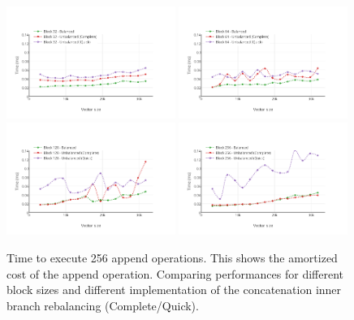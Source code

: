 \begin{figure}[h!]
  \centering
  \includegraphics[width=0.49\textwidth]{Benchmarks/Append_blocks_32.pdf}
  \includegraphics[width=0.49\textwidth]{Benchmarks/Append_blocks_64.pdf}
  \includegraphics[width=0.49\textwidth]{Benchmarks/Append_blocks_128.pdf}
  \includegraphics[width=0.49\textwidth]{Benchmarks/Append_blocks_256.pdf}
  \label{IterationBlocksBenchmarks}
  \caption{Time to execute 256 append operations. This shows the amortized cost of the append operation. Comparing performances for different block sizes and different implementation of the concatenation inner branch rebalancing (Complete/Quick).}
\end{figure}

